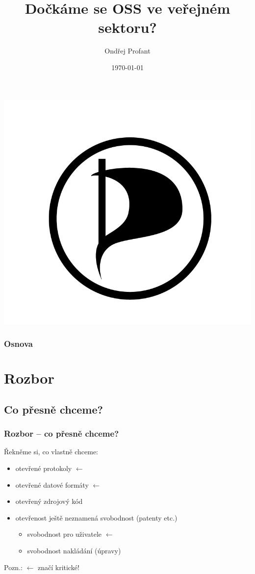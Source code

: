 \documentclass[12pt]{beamer}
\title{Dočkáme se OSS ve veřejném sektoru?}
\author{Ondřej Profant}
\institute[Piráti]{Česká pirátská strana}
\date{\today}
\begin{document}
\begin{frame}
  \titlepage
  \includegraphics[scale=0.4]{pic/plachta_s_okrajem.png}
\end{frame}

\begin{frame}
  \frametitle{Osnova}
  \tableofcontents
\end{frame}

\section{Rozbor}

\subsection{Co přesně chceme?}
\begin{frame}
 \frametitle{Rozbor -- co přesně chceme?}

	Řekněme si, co vlastně chceme:

 \begin{itemize}
  \item otevřené protokoly $\leftarrow$ 
  \item otevřené datové formáty $\leftarrow$
  \item otevřený zdrojový kód
  \item otevřenost ještě neznamená svobodnost (patenty etc.)
  \begin{itemize}
   \item svobodnost pro uživatele $\leftarrow$
   \item svobodnost nakládání (úpravy)
  \end{itemize}
 \end{itemize}
 Pozn.: $\leftarrow$ značí kritické!
\end{frame}
\end{document}
